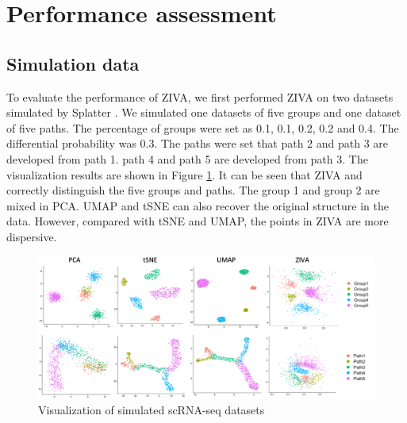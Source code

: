 \section{Performance assessment}
\subsection{Simulation data}
To evaluate the performance of ZIVA, we first performed ZIVA on two datasets simulated by Splatter \cite{zappia2017splatter}. We simulated one datasets of five groups and one dataset of five paths. The percentage of groups were set as 0.1, 0.1, 0.2, 0.2 and 0.4. The differential probability was 0.3. The paths were set that path 2 and path 3 are developed from path 1. path 4 and path 5 are developed from path 3. The visualization results are shown in Figure \ref{sim}. It can be seen that ZIVA and correctly distinguish the five groups and paths. The group 1 and group 2 are mixed in PCA. UMAP and tSNE can also recover the original structure in the data. However, compared with tSNE and UMAP, the points in ZIVA are more dispersive.
\begin{figure}[htb!]
    \centering
    \includegraphics[width=1\textwidth]{figures/myfigures/simdata.png}
    \caption{Visualization of simulated scRNA-seq datasets}
    \label{sim}
\end{figure}


